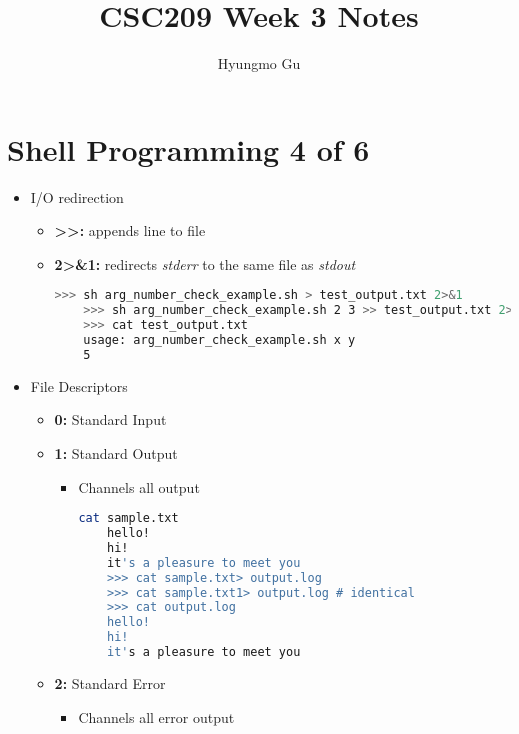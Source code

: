 \documentclass[12pt]{article}
\begin{document}
\title{CSC209 Week 3 Notes}
\author{Hyungmo Gu}
\maketitle

\section*{Shell Programming 4 of 6}

\bigskip

\begin{itemize}
    \item I/O redirection
    \begin{itemize}
    \item \textbf{\textgreater\textgreater:} appends line to file\
    \item \textbf{2\textgreater\&1:} redirects \textit{stderr} to the same file as \textit{stdout}

    \begin{lstlisting}[language=bash]
    >>> sh arg_number_check_example.sh > test_output.txt 2>&1
    >>> sh arg_number_check_example.sh 2 3 >> test_output.txt 2>&1
    >>> cat test_output.txt
    usage: arg_number_check_example.sh x y
    5
    \end{lstlisting}

    \end{itemize}
    \item File Descriptors
    \begin{itemize}
    \item \textbf{0:} Standard Input
    \item \textbf{1:} Standard Output
    \begin{itemize}
    \item Channels all output

    \begin{lstlisting}[language=bash]
    cat sample.txt
    hello!
    hi!
    it's a pleasure to meet you
    >>> cat sample.txt> output.log
    >>> cat sample.txt1> output.log # identical
    >>> cat output.log
    hello!
    hi!
    it's a pleasure to meet you
    \end{lstlisting}
    \end{itemize}

    \item \textbf{2:} Standard Error
    \begin{itemize}
    \item Channels all error output


\end{itemize}
\end{itemize}
\end{itemize}
\end{document}
